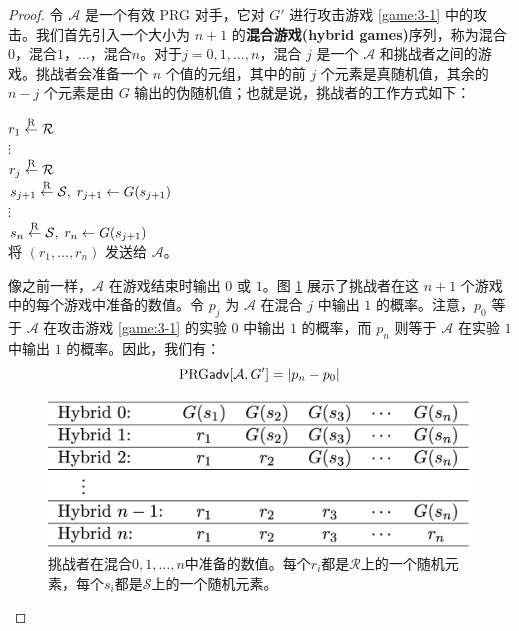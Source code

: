 \begin{proof}
令 $\mathcal A$ 是一个有效 PRG 对手，它对 $G'$ 进行攻击游戏 \ref{game:3-1} 中的攻击。我们首先引入一个大小为 $n+1$ 的\textbf{混合游戏(hybrid games)}序列，称为混合$0$，混合$1$，$\dots$，混合$n$。对于$j=0,1,\dots,n$，混合 $j$ 是一个 $\mathcal A$ 和挑战者之间的游戏。挑战者会准备一个 $n$ 个值的元组，其中的前 $j$ 个元素是真随机值，其余的 $n-j$ 个元素是由 $G$ 输出的伪随机值；也就是说，挑战者的工作方式如下：

\vspace*{5pt}

\hspace*{5pt} $r_1\overset{\rm R}\leftarrow\mathcal R$\\
\hspace*{50pt} $\vdots$\\
\hspace*{26pt} $r_j\overset{\rm R}\leftarrow\mathcal R$\\
\hspace*{26pt} $s_{j+1}\overset{\rm R}\leftarrow\mathcal{S},\;r_{j+1}\leftarrow G(s_{j+1})$\\
\hspace*{50pt} $\vdots$\\
\hspace*{26pt} $s_{n}\overset{\rm R}\leftarrow\mathcal{S},\;r_{n}\leftarrow G(s_{j+1})$\\
\hspace*{26pt} 将 $(r_1,\dots,r_n)$ 发送给 $\mathcal A$。

\vspace*{5pt}

\noindent
像之前一样，$\mathcal A$ 在游戏结束时输出 $0$ 或 $1$。图 \ref{fig:3-5} 展示了挑战者在这 $n+1$ 个游戏中的每个游戏中准备的数值。令 $p_j$ 为 $\mathcal A$ 在混合 $j$ 中输出 $1$ 的概率。注意，$p_0$ 等于 $\mathcal A$ 在攻击游戏 \ref{game:3-1} 的实验 $0$ 中输出 $1$ 的概率，而 $p_n$ 则等于 $\mathcal A$ 在实验 $1$ 中输出 $1$ 的概率。因此，我们有：
\begin{equation}\label{eq:3-9}
{\rm PRG\mathsf{adv}}[\mathcal{A},G']=|p_n-p_0|
\end{equation}

\begin{figure}
  \centering
  \includegraphics[width=0.55\linewidth]{figures/chapter3/fig5.png}
  \caption{挑战者在混合$0,1,\dots,n$中准备的数值。每个$r_i$都是$\mathcal{R}$上的一个随机元素，每个$s_i$都是$\mathcal{S}$上的一个随机元素。}
  \label{fig:3-5}
\end{figure}


\end{proof}
